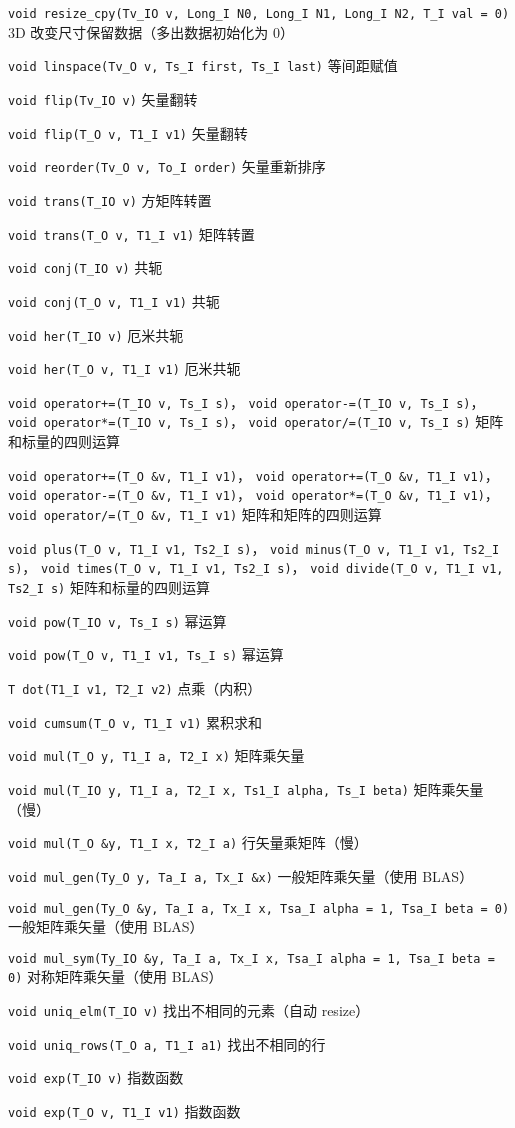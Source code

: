 \verb|void resize_cpy(Tv_IO v, Long_I N0, Long_I N1, Long_I N2, T_I val = 0)| 3D 改变尺寸保留数据（多出数据初始化为 0）

\verb|void linspace(Tv_O v, Ts_I first, Ts_I last)| 等间距赋值

\verb|void flip(Tv_IO v)| 矢量翻转

\verb|void flip(T_O v, T1_I v1)| 矢量翻转

\verb|void reorder(Tv_O v, To_I order)| 矢量重新排序

\verb|void trans(T_IO v)| 方矩阵转置

\verb|void trans(T_O v, T1_I v1)| 矩阵转置

\verb|void conj(T_IO v)| 共轭

\verb|void conj(T_O v, T1_I v1)| 共轭

\verb|void her(T_IO v)| 厄米共轭

\verb|void her(T_O v, T1_I v1)| 厄米共轭

\verb|void operator+=(T_IO v, Ts_I s)|， \verb|void operator-=(T_IO v, Ts_I s)|， \verb|void operator*=(T_IO v, Ts_I s)|， \verb|void operator/=(T_IO v, Ts_I s)| 矩阵和标量的四则运算

\verb|void operator+=(T_O &v, T1_I v1)|， \verb|void operator+=(T_O &v, T1_I v1)|， \verb|void operator-=(T_O &v, T1_I v1)|， \verb|void operator*=(T_O &v, T1_I v1)|， \verb|void operator/=(T_O &v, T1_I v1)| 矩阵和矩阵的四则运算

\verb|void plus(T_O v, T1_I v1, Ts2_I s)|， \verb|void minus(T_O v, T1_I v1, Ts2_I s)|， \verb|void times(T_O v, T1_I v1, Ts2_I s)|， \verb|void divide(T_O v, T1_I v1, Ts2_I s)| 矩阵和标量的四则运算

\verb|void pow(T_IO v, Ts_I s)| 幂运算

\verb|void pow(T_O v, T1_I v1, Ts_I s)| 幂运算

\verb|T dot(T1_I v1, T2_I v2)| 点乘（内积）

\verb|void cumsum(T_O v, T1_I v1)| 累积求和

\verb|void mul(T_O y, T1_I a, T2_I x)| 矩阵乘矢量

\verb|void mul(T_IO y, T1_I a, T2_I x, Ts1_I alpha, Ts_I beta)| 矩阵乘矢量（慢）

\verb|void mul(T_O &y, T1_I x, T2_I a)| 行矢量乘矩阵（慢）

\verb|void mul_gen(Ty_O y, Ta_I a, Tx_I &x)| 一般矩阵乘矢量（使用 BLAS）

\verb|void mul_gen(Ty_O &y, Ta_I a, Tx_I x, Tsa_I alpha = 1, Tsa_I beta = 0)| 一般矩阵乘矢量（使用 BLAS）

\verb|void mul_sym(Ty_IO &y, Ta_I a, Tx_I x, Tsa_I alpha = 1, Tsa_I beta = 0)| 对称矩阵乘矢量（使用 BLAS）

\verb|void uniq_elm(T_IO v)| 找出不相同的元素（自动 resize）

\verb|void uniq_rows(T_O a, T1_I a1)| 找出不相同的行

\verb|void exp(T_IO v)| 指数函数

\verb|void exp(T_O v, T1_I v1)| 指数函数
